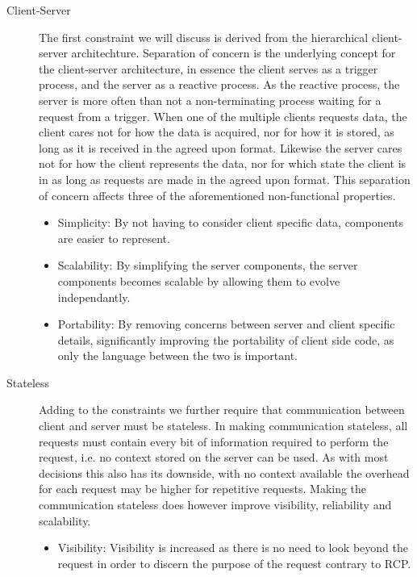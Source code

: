 \begin{description}
    \item [Client-Server\label{client-server-rest}] The first constraint we will discuss is derived from the hierarchical client-server architechture.
    Separation of concern is the underlying concept for the client-server architecture, in essence the client serves as a trigger process, and the server as a reactive process.
    As the reactive process, the server is more often than not a non-terminating process waiting for a request from a trigger.
    When one of the multiple clients requests data, the client cares not for how the data is acquired, nor for how it is stored, as long as it is received in the agreed upon format.
    Likewise the server cares not for how the client represents the data, nor for which state the client is in as long as requests are made in the agreed upon format.
    This separation of concern affects three of the aforementioned non-functional properties.
    \begin{itemize}
        \item Simplicity: By not having to consider client specific data, components are easier to represent.
        \item Scalability: By simplifying the server components, the server components becomes scalable by allowing them to evolve independantly.
        \item Portability: By removing concerns between server and client specific details, significantly improving the portability of client side code, as only the language between the two is important.
    \end{itemize}
    \item [Stateless] Adding to the constraints we further require that communication between client and server must be stateless.
    In making communication stateless, all requests must contain every bit of information required to perform the request, i.e. no context stored on the server can be used.
    As with most decisions this also has its downside, with no context available the overhead for each request may be higher for repetitive requests.
    Making the communication stateless does however improve visibility, reliability and scalability.
    \begin{itemize}
        \item Visibility: Visibility is increased as there is no need to look beyond the request in order to discern the purpose of the request contrary to RCP.

\end{itemize}
\end{description}
